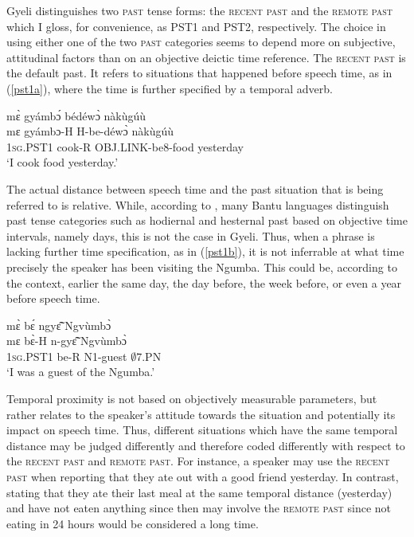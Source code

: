 Gyeli distinguishes two \textsc{past} tense forms: the \textsc{recent past} and the \textsc{remote past} which I gloss, for convenience, as PST1 and PST2, respectively.  The choice in using either one of the two \textsc{past} categories seems to depend more on subjective, attitudinal factors than on an objective deictic time reference. The \textsc{recent past} is the default past.
It refers to situations that happened before speech time, as in (\ref{pst1a}), where the time is further specified by a temporal adverb.

\begin{exe} 
\ex\label{pst1a} 
  \glll  mɛ̀ gyámbɔ́ bédéwɔ̀ nàkùgúù \\
         mɛ gyámbɔ-H H-be-déwɔ̀ nàkùgúù\\
            1\textsc{sg}.PST1 cook-R OBJ.LINK-be8-food yesterday \\
    \trans `I cook food yesterday.'
\end{exe}

The actual distance between speech time and the past situation that is being referred to is relative. While, according to \citet[22]{nurse08}, many Bantu languages distinguish past tense categories  such as hodiernal and hesternal past based on objective time intervals, namely days, this is not the case in Gyeli. Thus, when a phrase is lacking further time specification, as in (\ref{pst1b}), it is not inferrable at what time precisely the speaker has been visiting the Ngumba. This could be, according to the context, earlier the same day, the day before, the week before, or even a year before speech time.

\begin{exe} 
\ex\label{pst1b}
  \glll   mɛ̀ bɛ́ ngyɛ̃̂ Ngvùmbɔ̀ \\
          mɛ bɛ̀-H n-gyɛ̃̂ Ngvùmbɔ̀ \\
           1\textsc{sg}.PST1 be-R N1-guest $\emptyset$7.PN  \\
    \trans `I was a guest of the Ngumba.'
\end{exe}

\noindent Temporal proximity is not based on objectively measurable parameters, but rather relates to the speaker's attitude towards the situation and potentially its impact on speech time. Thus, different situations which have the same temporal distance may be judged differently and therefore coded differently with respect to the \textsc{recent past} and \textsc{remote past}. For instance, a speaker may use the \textsc{recent past} when reporting that they ate out with a good friend yesterday. In contrast, stating that they ate their last meal at the same temporal distance (yesterday) and have not eaten anything since then may involve the \textsc{remote past} since not eating in 24 hours would be considered a long time.

